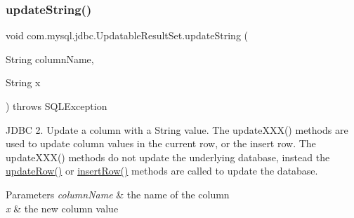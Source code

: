 \subsubsection{\texorpdfstring{update\+String()}{updateString()}\hspace{0.1cm}{\footnotesize\ttfamily [2/2]}}
{\footnotesize\ttfamily void com.\+mysql.\+jdbc.\+Updatable\+Result\+Set.\+update\+String (\begin{DoxyParamCaption}\item[{String}]{column\+Name,  }\item[{String}]{x }\end{DoxyParamCaption}) throws S\+Q\+L\+Exception}

J\+D\+BC 2. Update a column with a String value. The update\+X\+X\+X() methods are used to update column values in the current row, or the insert row. The update\+X\+X\+X() methods do not update the underlying database, instead the \mbox{\hyperlink{classcom_1_1mysql_1_1jdbc_1_1_updatable_result_set_a919969ba4b3c7cbc7b18605e9f31a746}{update\+Row()}} or \mbox{\hyperlink{classcom_1_1mysql_1_1jdbc_1_1_updatable_result_set_aef041f8d9d0778083716fc26652648fa}{insert\+Row()}} methods are called to update the database.


\begin{DoxyParams}{Parameters}
{\em column\+Name} & the name of the column \\
\hline
{\em x} & the new column value\\
\hline
\end{DoxyParams}

